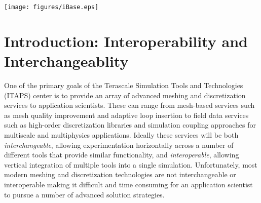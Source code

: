 \documentclass{article}
\begin{document}
\hspace{-1in}
\texttt{[image: figures/iBase.eps]}

\newpage
\tableofcontents
\newpage
\section{Introduction: Interoperability and Interchangeablity}

One of the primary goals of the Terascale Simulation Tools and 
Technologies (ITAPS) center is to provide an array of advanced 
meshing and discretization services to application scientists. 
These can range from mesh-based services such as mesh quality 
improvement and adaptive loop insertion to field data services 
such as high-order discretization libraries and simulation coupling 
approaches for multiscale and multiphysics applications. Ideally 
these services will be both \textit{interchangeable}, allowing experimentation 
horizontally across a number of different tools that provide 
similar functionality, and \textit{interoperable}, allowing vertical 
integration of multiple tools into a single simulation. Unfortunately, 
most modern meshing and discretization technologies are not interchangeable 
or interoperable making it difficult and time consuming for an 
application scientist to pursue a number of advanced solution 
strategies. 
\end{document}
